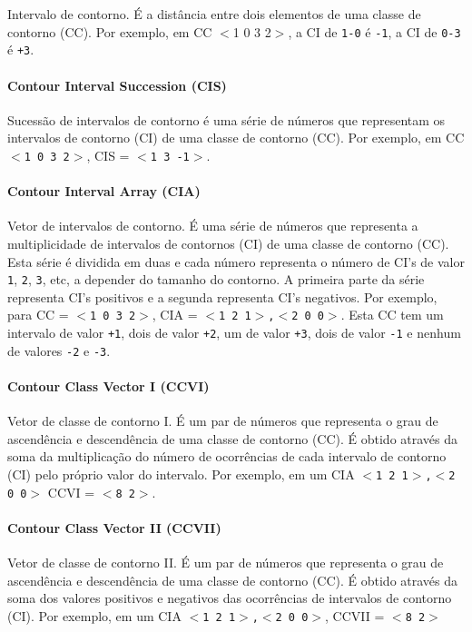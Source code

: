 \documentclass[12pt,brazil]{book}
\begin{document}
Intervalo de contorno. É a distância entre dois elementos de uma
classe de contorno (CC). Por exemplo, em CC $<$1 0 3 2$>$, a CI de \texttt{1-0} é
\texttt{-1}, a CI de \texttt{0-3} é \texttt{+3}.

\paragraph{Contour Interval Succession (CIS)}
\label{sec:cont-interv-succ}

Sucessão de intervalos de contorno é uma série de números que
representam os intervalos de contorno (CI) de uma classe de contorno
(CC). Por exemplo, em CC \texttt{$<$1 0 3 2$>$}, CIS = \texttt{$<$1 3 -1$>$}.

\paragraph{Contour Interval Array (CIA)}
\label{sec:cont-interv-array}

Vetor de intervalos de contorno. É uma série de números que representa
a multiplicidade de intervalos de contornos (CI) de uma classe de
contorno (CC). Esta série é dividida em duas e cada número representa
o número de CI's de valor \texttt{1}, \texttt{2}, \texttt{3}, etc, a
depender do tamanho do contorno. A primeira parte da série representa
CI's positivos e a segunda representa CI's negativos. Por exemplo,
para CC = \texttt{$<$1 0 3 2$>$}, CIA = \texttt{$<$1 2 1$>$,$<$2 0
  0$>$}. Esta CC tem um intervalo de valor \texttt{+1}, dois de valor
\texttt{+2}, um de valor \texttt{+3}, dois de valor \texttt{-1} e
nenhum de valores \texttt{-2} e \texttt{-3}.

\paragraph{Contour Class Vector I (CCVI)}
\label{sec:contour-class-vector-1}

Vetor de classe de contorno I. É um par de números que representa o
grau de ascendência e descendência de uma classe de contorno (CC). É
obtido através da soma da multiplicação do número de ocorrências de
cada intervalo de contorno (CI) pelo próprio valor do intervalo. Por
exemplo, em um CIA \texttt{$<$1 2 1$>$,$<$2 0 0$>$} CCVI =
\texttt{$<$8 2$>$}.

\paragraph{Contour Class Vector II (CCVII)}
\label{sec:contour-class-vector-2}

Vetor de classe de contorno II. É um par de números que representa o
grau de ascendência e descendência de uma classe de contorno (CC). É
obtido através da soma dos valores positivos e negativos das
ocorrências de intervalos de contorno (CI). Por exemplo, em um CIA
\texttt{$<$1 2 1$>$,$<$2 0 0$>$}, CCVII = \texttt{$<$8 2$>$}
\end{document}
